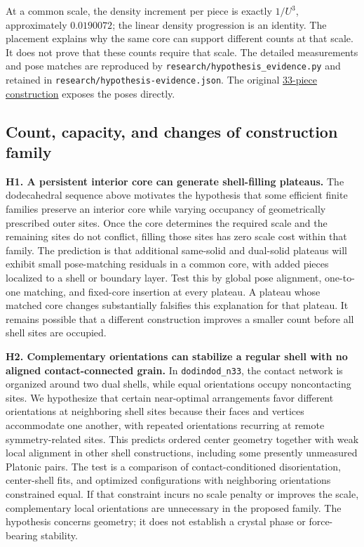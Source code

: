 \documentclass[11pt,a4paper]{article}
\begin{document}
At a common scale, the density increment per piece is exactly $1/U^3$, approximately $0.0190072$; the linear density progression is an identity. The placement explains why the same core can support different counts at that scale. It does not prove that these counts require that scale. The detailed measurements and pose matches are reproduced by \nolinkurl{research/hypothesis_evidence.py} and retained in \nolinkurl{research/hypothesis-evidence.json}. The original \href{https://github.com/alejandrozu/platonic-packing/blob/e15b496ae7306287e0e70bb5b14be79f5dfdde84/records/dodindod/dodindod\_n33.json}{33-piece construction} exposes the poses directly.

\subsection{Count, capacity, and changes of construction family}

\textbf{H1. A persistent interior core can generate shell-filling plateaus.} The dodecahedral sequence above motivates the hypothesis that some efficient finite families preserve an interior core while varying occupancy of geometrically prescribed outer sites. Once the core determines the required scale and the remaining sites do not conflict, filling those sites has zero scale cost within that family. The prediction is that additional same-solid and dual-solid plateaus will exhibit small pose-matching residuals in a common core, with added pieces localized to a shell or boundary layer. Test this by global pose alignment, one-to-one matching, and fixed-core insertion at every plateau. A plateau whose matched core changes substantially falsifies this explanation for that plateau. It remains possible that a different construction improves a smaller count before all shell sites are occupied.

\textbf{H2. Complementary orientations can stabilize a regular shell with no aligned contact-connected grain.} In \nolinkurl{dodindod_n33}, the contact network is organized around two dual shells, while equal orientations occupy noncontacting sites. We hypothesize that certain near-optimal arrangements favor different orientations at neighboring shell sites because their faces and vertices accommodate one another, with repeated orientations recurring at remote symmetry-related sites. This predicts ordered center geometry together with weak local alignment in other shell constructions, including some presently unmeasured Platonic pairs. The test is a comparison of contact-conditioned disorientation, center-shell fits, and optimized configurations with neighboring orientations constrained equal. If that constraint incurs no scale penalty or improves the scale, complementary local orientations are unnecessary in the proposed family. The hypothesis concerns geometry; it does not establish a crystal phase or force-bearing stability.
\end{document}

